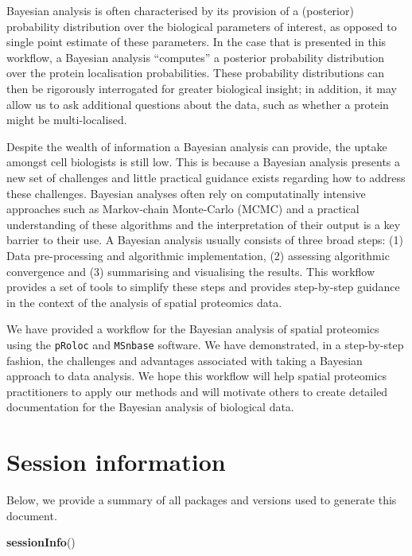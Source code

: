 \documentclass[
]{article}
\newenvironment{Shaded}{\begin{snugshade}}{\end{snugshade}}
\newcommand{\KeywordTok}[1]{\textcolor[rgb]{0.13,0.29,0.53}{\textbf{#1}}}
\newcommand{\NormalTok}[1]{#1}
\begin{document}
Bayesian analysis is often characterised by its provision of a
(posterior) probability distribution over the biological parameters of
interest, as opposed to single point estimate of these parameters. In
the case that is presented in this workflow, a Bayesian analysis
``computes'' a posterior probability distribution over the protein
localisation probabilities. These probability distributions can then be
rigorously interrogated for greater biological insight; in addition, it
may allow us to ask additional questions about the data, such as whether
a protein might be multi-localised.

Despite the wealth of information a Bayesian analysis can provide, the
uptake amongst cell biologists is still low. This is because a Bayesian
analysis presents a new set of challenges and little practical guidance
exists regarding how to address these challenges. Bayesian analyses
often rely on computatinally intensive approaches such as Markov-chain
Monte-Carlo (MCMC) and a practical understanding of these algorithms and
the interpretation of their output is a key barrier to their use. A
Bayesian analysis usually consists of three broad steps: (1) Data
pre-processing and algorithmic implementation, (2) assessing algorithmic
convergence and (3) summarising and visualising the results. This
workflow provides a set of tools to simplify these steps and provides
step-by-step guidance in the context of the analysis of spatial
proteomics data.

We have provided a workflow for the Bayesian analysis of spatial
proteomics using the \texttt{pRoloc} and \texttt{MSnbase} software. We
have demonstrated, in a step-by-step fashion, the challenges and
advantages associated with taking a Bayesian approach to data analysis.
We hope this workflow will help spatial proteomics practitioners to
apply our methods and will motivate others to create detailed
documentation for the Bayesian analysis of biological data.

\hypertarget{session-information}{%
\section{Session information}\label{session-information}}

Below, we provide a summary of all packages and versions used to
generate this document.

\begin{Shaded}
\begin{Highlighting}[]
\KeywordTok{sessionInfo}\NormalTok{()}
\end{Highlighting}
\end{Shaded}
\end{document}
